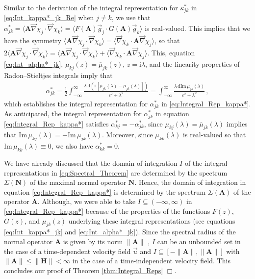 \documentclass[11pt]{amsart}
\newcommand{\I}{\mathrm{i}}
\renewcommand{\d}{\mathrm{d}}
\newcommand{\Hb}{\mathbf{H}}
\newcommand{\Ab}{\mathbf{A}}
\newcommand{\Nb}{\mathbf{N}}
\begin{document}
Similar to the derivation of the integral representation for
$\kappa^*_{jk}$ in \eqref{eq:Int_kappa*_jk_Re} when $j\neq k$, we use that
$\alpha^*_{jk}=\langle\Ab\vec{\nabla}\chi_j\cdot\vec{\nabla}\chi_k\rangle=\langle
F(\Ab)\vec{g}_j\cdot G(\Ab)\vec{g}_k\rangle$ is real-valued. This implies that we
have the symmetry
$\langle\Ab\vec{\nabla}\chi_j\cdot\vec{\nabla}\chi_k\rangle=\langle\vec{\nabla}\chi_k\cdot\Ab\vec{\nabla}\chi_j\rangle$, so that
$2\langle\Ab\vec{\nabla}\chi_j\cdot\vec{\nabla}\chi_k\rangle=\langle\Ab\vec{\nabla}\chi_j\cdot\vec{\nabla}\chi_k\rangle+\langle\vec{\nabla}\chi_k\cdot\Ab\vec{\nabla}\chi_j\rangle$.
This, equation \eqref{eq:Int_alpha*_jk},
$\mu_{kj}(z)=\overline{\mu}_{jk}(z)$, $z=\I\lambda$, and the
linearity properties of Radon--Stieltjes integrals \cite{Stone:64}
imply that 
% 
\begin{align}\label{eq:Int_kappa*_jk_Im}
  \alpha^*_{jk}
       =\frac{1}{2}\int_{-\infty}^\infty\frac{\lambda\,\d(\I\,[\overline{\mu}_{jk}(\lambda)-\mu_{jk}(\lambda)])}{\varepsilon^2+\lambda^2}
       =\int_{-\infty}^\infty\frac{\lambda\,\d\text{Im}\,\mu_{jk}(\lambda)}{\varepsilon^2+\lambda^2}\,,            
\end{align}
%
which establishes the integral representation for $\alpha^*_{jk}$ in
\eqref{eq:Integral_Rep_kappa*}. As anticipated, the integral
representation for $\alpha^*_{jk}$ in equation
\eqref{eq:Integral_Rep_kappa*} satisfies $\alpha^*_{kj}=-\alpha^*_{jk}$, since
$\mu_{kj}(\lambda)=\overline{\mu}_{jk}(\lambda)$ implies that
$\text{Im}\,\mu_{kj}(\lambda)=-\text{Im}\,\mu_{jk}(\lambda)$. Moreover, since
$\mu_{kk}(\lambda)$ is real-valued so that $\text{Im}\,\mu_{kk}(\lambda)\equiv0$, we also
have $\alpha^*_{kk}=0$.   



We have already discussed that the domain of integration $I$ of the
integral representations in \eqref{eq:Spectral_Theorem} are determined
by the spectrum $\Sigma(\Nb)$ of the maximal normal operator $\Nb$. Hence,
the domain of integration in equation \eqref{eq:Integral_Rep_kappa*}
is determined by the spectrum $\Sigma(\Ab)$ of the operator
$\Ab$. Although, we were able to take $I\subseteq(-\infty,\infty)$ in
\eqref{eq:Integral_Rep_kappa*} because of the properties of the
functions $F(z)$, $G(z)$, and $\mu_{jk}(z)$ underlying these integral
representations (see equations \eqref{eq:Int_kappa*_jk} and
\eqref{eq:Int_alpha*_jk}). Since the spectral radius of the normal
operator $\Ab$ is given by its norm $\|\Ab\|$ \cite{Reed-1980}, $I$ can
be an unbounded set in the case of a time-dependent velocity field
$\vec{u}$ and $I\subseteq[-\|\Ab\|,\|\Ab\|]$ with $\|\Ab\|\leq\|\Hb\|<\infty$ in the case of a
time-independent velocity field. This concludes our proof of Theorem
\ref{thm:Integral_Reps} $\Box$.    
\end{document}
